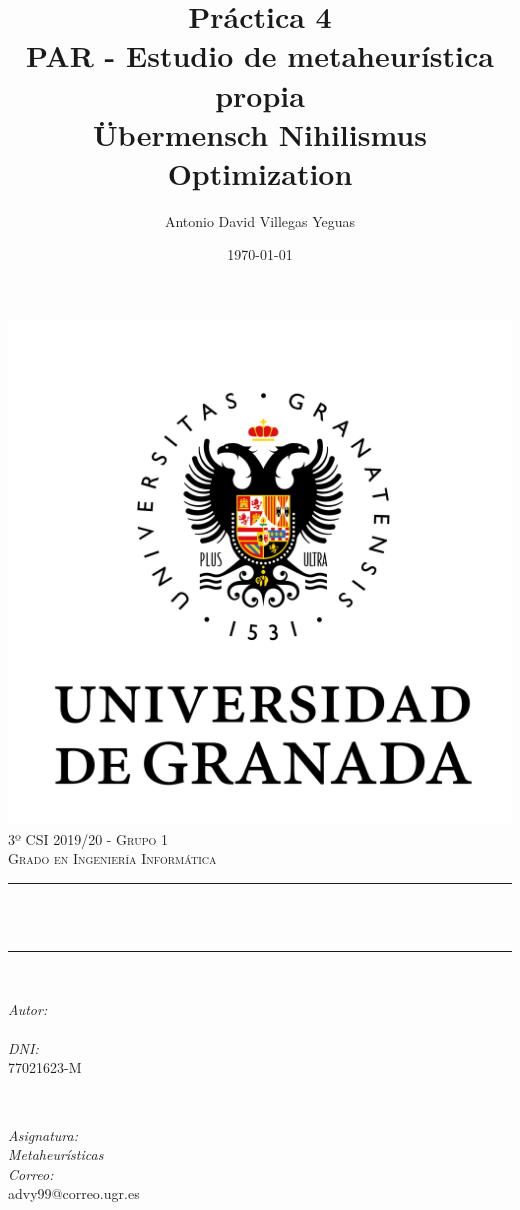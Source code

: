 \documentclass[12pt, spanish]{article}
\title{Práctica 4\\
PAR - Estudio de metaheurística propia\\Übermensch Nihilismus Optimization \hspace{0.05cm} }
\author{Antonio David Villegas Yeguas}
\date{\today}
\makeatletter
\let\thetitle\@title
\let\theauthor\@author
\makeatother
\begin{document}

\begin{titlepage}
    \centering
    \vspace*{0.3 cm}
    \includegraphics[scale = 0.50]{ugr.png}\\[0.7 cm]
    \textsc{\large 3º CSI 2019/20 - Grupo 1}\\[0.5 cm]
    \textsc{\large Grado en Ingeniería Informática}\\[0.5 cm]
    \rule{\linewidth}{0.2 mm} \\[0.2 cm]
    { \huge \bfseries \thetitle}\\
    \rule{\linewidth}{0.2 mm} \\[0.3 cm]

    \begin{minipage}{0.4\textwidth}
        \begin{flushleft} \large
            \emph{Autor:}\\
            \theauthor\\
			 \emph{DNI:}\\
            77021623-M
            \end{flushleft}
            \end{minipage}~
            \begin{minipage}{0.4\textwidth}
            \begin{flushright} \large
            \emph{Asignatura: \\
            Metaheurísticas}   \\
            \emph{Correo:}\\
            advy99@correo.ugr.es
        \end{flushright}
    \end{minipage}\\[0.2 cm]


\end{titlepage}
\end{document}
